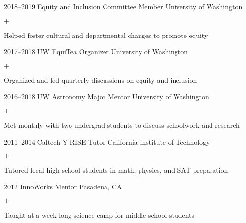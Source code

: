 \documentclass[]{luger-cv} %
\begin{document}
\begin{entrylist}
\entry
{2018--2019}
{Equity and Inclusion Committee Member}
{University of Washington}
{%
\vspace{-1em}
\begin{list}{$+$}{\cvlist}
\item Helped foster cultural and departmental changes to promote equity
\end{list}
}

\entry
{2017--2018}
{UW EquiTea Organizer}
{University of Washington}
{%
\vspace{-1em}
\begin{list}{$+$}{\cvlist}
\item Organized and led quarterly discussions on equity and inclusion
\end{list}
}


\entry
{2016--2018}
{UW Astronomy Major Mentor}
{University of Washington}
{%
\vspace{-1em}
\begin{list}{$+$}{\cvlist}
\item Met monthly with two undergrad students to discuss schoolwork and research
\end{list}
}


\ifdefined \onepage \else
\end{entrylist}
%
%
\begin{entrylist}
\fi


\entry
{2011--2014}
{Caltech Y RISE Tutor}
{California Institute of Technology}
{%
\vspace{-1em}
\begin{list}{$+$}{\cvlist}
\item Tutored local high school students in math, physics, and SAT preparation
\fi
\end{list}
}

%

\ifdefined \onepage \else
\entry
{2012}
{InnoWorks Mentor}
{Pasadena, CA}
{%
\vspace{-1em}
\begin{list}{$+$}{\cvlist}
\item Taught at a week-long science camp for middle school students
\end{list}
}
\fi


\end{entrylist}
\end{document}
